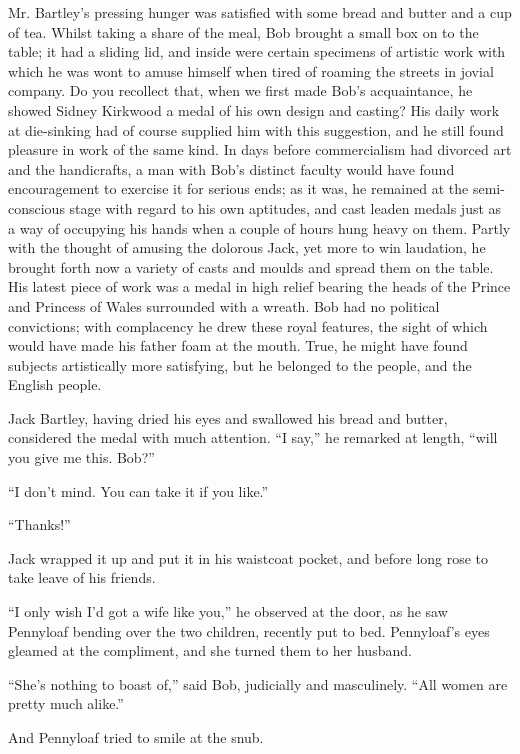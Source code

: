 Mr. Bartley's pressing hunger was satisfied with some bread and butter
and a cup of tea. Whilst taking a share of the meal, Bob brought a small
box on to the table; it had a sliding lid, and inside were certain
specimens of artistic work with which he was wont to amuse himself when
tired of roaming the streets in jovial company. Do you recollect that,
when we first made Bob's acquaintance, he showed Sidney Kirkwood a medal
of his own design and casting? His daily work at die-sinking had of
course supplied him with this suggestion, and he still found pleasure in
work of the same kind. In days before commercialism had divorced art and
the handicrafts, a man with Bob's distinct faculty would have found
encouragement to exercise it for serious ends; as it was, he remained at
the semi-conscious stage with regard to his own aptitudes, and cast
leaden medals just as a way of occupying his hands when a couple of
hours hung heavy on them. Partly with the thought of amusing the
dolorous Jack, yet more to win {}laudation, he brought forth now a
variety of casts and moulds and spread them on the table. His latest
piece of work was a medal in high relief bearing the heads of the Prince
and Princess of Wales surrounded with a wreath. Bob had no political
convictions; with complacency he drew these royal features, the sight of
which would have made his father foam at the mouth. True, he might have
found subjects artistically more satisfying, but he belonged to the
people, and the English people.

Jack Bartley, having dried his eyes and swallowed his bread and butter,
considered the medal with much attention. ``I say,'' he remarked at
length, ``will you give me this. Bob?''

``I don't mind. You can take it if you like.''

``Thanks!''

Jack wrapped it up and put it in his waistcoat pocket, and before long
rose to take leave of his friends.

``I only wish I'd got a wife like you,'' he observed at the door, as he
saw Pennyloaf bending over the two children, recently put to bed.
{}Pennyloaf's eyes gleamed at the compliment, and she turned them to her
husband.

``She's nothing to boast of,'' said Bob, judicially and masculinely.
``All women are pretty much alike.''

And Pennyloaf tried to smile at the snub.

